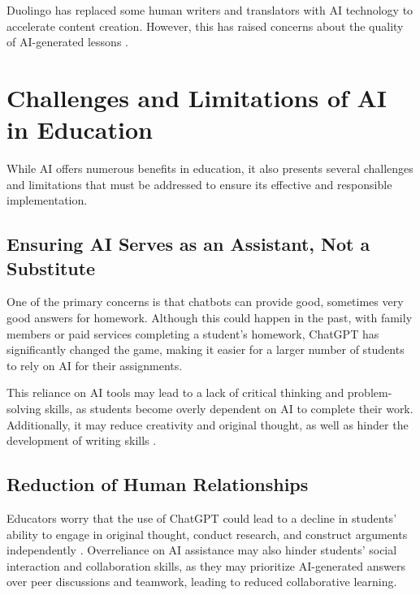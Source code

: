 \documentclass{article}
\begin{document}
Duolingo has replaced some human writers and translators with AI technology to accelerate content creation. However, this has raised concerns about the quality of AI-generated lessons \cite{https://www.baselinemag.com/artificial-intelligence-ai/duolingo-embraces-ai-the-impact-on-language-learning/} \cite{https://www.tomedes.com/translator-hub/ai-revolution-through-duolingo}.












\newpage
\section{Challenges and Limitations of AI in Education}

While AI offers numerous benefits in education, it also presents several challenges and limitations that must be addressed to ensure its effective and responsible implementation.

\subsection{Ensuring AI Serves as an Assistant, Not a Substitute}

One of the primary concerns is that chatbots can provide good, sometimes very good answers for homework. Although this could happen in the past, with family members or paid services completing a student's homework, ChatGPT has significantly changed the game, making it easier for a larger number of students to rely on AI for their assignments.

This reliance on AI tools may lead to a lack of critical thinking and problem-solving skills, as students become overly dependent on AI to complete their work. Additionally, it may reduce creativity and original thought, as well as hinder the development of writing skills \cite{https://www.mdpi.com/2073-431X/12/8/153}.

\subsection{Reduction of Human Relationships}

Educators worry that the use of ChatGPT could lead to a decline in students' ability to engage in original thought, conduct research, and construct arguments independently \cite{https://www.mdpi.com/2073-431X/12/8/153}. Overreliance on AI assistance may also hinder students' social interaction and collaboration skills, as they may prioritize AI-generated answers over peer discussions and teamwork, leading to reduced collaborative learning.
\end{document}
